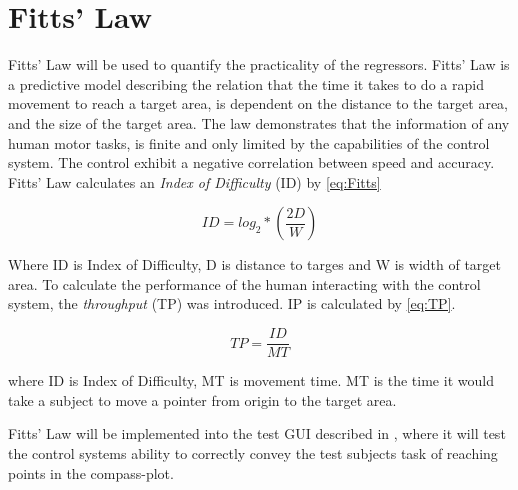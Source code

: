 \section{Fitts' Law}

Fitts' Law will be used to quantify the practicality of the regressors. Fitts' Law is a predictive model describing the relation that the time it takes to do a rapid movement to reach a target area, is dependent on the distance to the target area, and the size of the target area. The law demonstrates that the information of any human motor tasks, is finite and only limited by the capabilities of the control system. The control exhibit a negative correlation between speed and accuracy. \cite{Kamavuako2014}
Fitts' Law calculates an \textit{Index of Difficulty} (ID) by \eqref{eq:Fitts}

\begin{equation} \label{eq:Fitts}
ID = log_{2} * (\frac{2D}{W})
\end{equation}

Where ID is Index of Difficulty, D is distance to targes and W is width of target area.
To calculate the performance of the human interacting with the control system, the \textit{throughput} (TP) was introduced. IP is calculated by \eqref{eq:TP}.

\begin{equation} \label{eq:TP}
TP = \frac{ID}{MT}
\end{equation}

where ID is Index of Difficulty, MT is movement time.
MT is the time it would take a subject to move a pointer from origin to the target area.

Fitts' Law will be implemented into the test GUI described in , where it will test the control systems ability to correctly convey the test subjects task of reaching points in the compass-plot.
